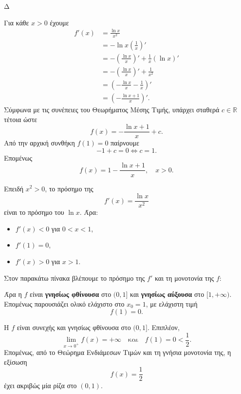 \begin{thema}{Δ}
\begin{erwthma}
\item Για κάθε $x>0$ έχουμε
\begin{align*}
f'(x)
&=\frac{\ln x}{x^2}\\
&=-\ln x\left(\frac{1}{x}\right)'\\
&=-\left(\frac{\ln x}{x}\right)'
+\frac{1}{x}(\ln x)'\\
&=-\left(\frac{\ln x}{x}\right)'
+\frac{1}{x^2}\\
&=\left(-\frac{\ln x}{x}-\frac{1}{x}\right)'\\
&=\left(-\frac{\ln x+1}{x}\right)'.
\end{align*}
Σύμφωνα με τις συνέπειες του Θεωρήματος Μέσης Τιμής, υπάρχει σταθερά $c\in\mathbb{R}$ τέτοια ώστε
\[
f(x)=-\frac{\ln x+1}{x}+c.
\]
Από την αρχική συνθήκη $f(1)=0$ παίρνουμε
\[
-1+c=0\Leftrightarrow c=1.
\]
Επομένως
\[
{f(x)=1-\frac{\ln x+1}{x}},\quad x>0.
\]

\item Επειδή $x^2>0$, το πρόσημο της
\[
f'(x)=\frac{\ln x}{x^2}
\]
είναι το πρόσημο του $\ln x$. Άρα:
\begin{itemize}
\item $f'(x)<0$ για $0<x<1$,
\item $f'(1)=0$,
\item $f'(x)>0$ για $x>1$.
\end{itemize}
Στον παρακάτω πίνακα βλέπουμε το πρόσημο της $f'$ και τη μονοτονία της $f$:
\begin{center}
\end{center}

Άρα η $f$ είναι \textbf{γνησίως φθίνουσα} στο $(0,1]$ και \textbf{γνησίως αύξουσα} στο $[1,+\infty)$. Επομένως παρουσιάζει ολικό ελάχιστο στο $x_0=1$, με ελάχιστη τιμή
\[
{f(1)=0}.
\]

\item Η $f$ είναι συνεχής και γνησίως φθίνουσα στο $(0,1]$. Επιπλέον,
\[
\lim_{x\to0^+}f(x)=+\infty
\quad\text{και}\quad
f(1)=0<\frac{1}{2}.
\]
Επομένως, από το Θεώρημα Ενδιάμεσων Τιμών και τη γνήσια μονοτονία της, η εξίσωση
\[
f(x)=\frac{1}{2}
\]
έχει ακριβώς μία ρίζα στο $(0,1)$.


\end{erwthma}
\end{thema}
